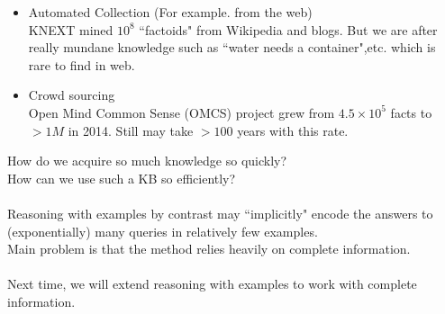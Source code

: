 \documentclass[10pt]{article}
\begin{document}
\begin{itemize}
  \item Automated Collection (For example. from the web)\\
	KNEXT mined $10^8$ ``factoids" from Wikipedia  and blogs. But we are after really mundane knowledge such as ``water needs a container",etc. which is rare to find in web.
\item Crowd sourcing\\
 Open Mind Common Sense (OMCS) project grew from $4.5 \times 10^5$ facts to $>1M$ in 2014. Still may take $>100$ years with this rate.
\end{itemize}
How do we acquire so much knowledge so quickly?\\
How can we use such a KB so efficiently?\\
\\
Reasoning with examples by contrast may ``implicitly" encode the answers to (exponentially) many queries in relatively few examples.\\
Main problem is that the method relies heavily on complete information.\\
\\
Next time, we will extend reasoning with examples to work with complete information. 
\end{document}
